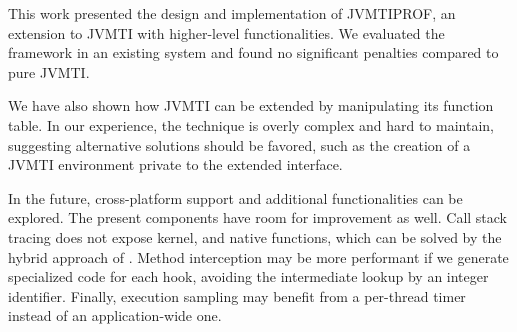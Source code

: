\label{cap:conclusion}

This work presented the design and implementation of JVMTIPROF, an extension to JVMTI with higher-level functionalities. We evaluated the framework in an existing system and found no significant penalties compared to pure JVMTI.

We have also shown how JVMTI can be extended by manipulating its function table. In our experience, the technique is overly complex and hard to maintain, suggesting alternative solutions should be favored, such as the creation of a JVMTI environment private to the extended interface.

In the future, cross-platform support and additional functionalities can be explored. The present components have room for improvement as well. Call stack tracing does not expose kernel, and native functions, which can be solved by the hybrid approach of . Method interception may be more performant if we generate specialized code for each hook, avoiding the intermediate lookup by an integer identifier. Finally, execution sampling may benefit from a per-thread timer instead of an application-wide one.
